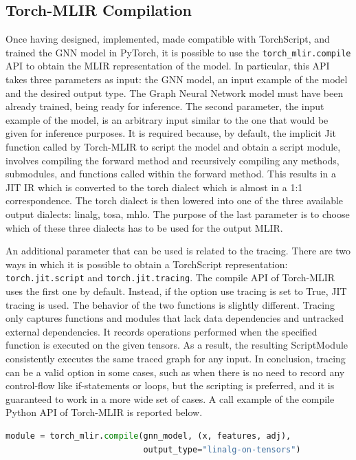 \subsection{Torch-MLIR Compilation}
\label{subsec:torch-mlir-compilation}%

Once having designed, implemented, made compatible with TorchScript, and trained the GNN model in PyTorch, it is possible to use the \lstinline{torch_mlir.compile} API to obtain the MLIR representation of the model.
In particular, this API takes three parameters as input: the GNN model, an input example of the model and the desired output type.
The Graph Neural Network model must have been already trained, being ready for inference.
The second parameter, the input example of the model, is an arbitrary input similar to the one that would be given for inference purposes.
It is required because, by default, the implicit Jit function called by Torch-MLIR to script the model and obtain a script module, involves compiling the forward method and recursively compiling any methods, submodules, and functions called within the forward method. This results in a JIT IR which is converted to the torch dialect which is almost in a 1:1 correspondence.
The torch dialect is then lowered into one of the three available output dialects: linalg, tosa, mhlo.
The purpose of the last parameter is to choose which of these three dialects has to be used for the output MLIR.

An additional parameter that can be used is related to the tracing.
There are two ways in which it is possible to obtain a TorchScript representation: \lstinline{torch.jit.script} and \lstinline{torch.jit.tracing}.
The compile API of Torch-MLIR uses the first one by default.
Instead, if the option use tracing is set to True, JIT tracing is used.
The behavior of the two functions is slightly different.
Tracing only captures functions and modules that lack data dependencies and untracked external dependencies.
It records operations performed when the specified function is executed on the given tensors.
As a result, the resulting ScriptModule consistently executes the same traced graph for any input.
In conclusion, tracing can be a valid option in some cases, such as when there is no need to record any control-flow like if-statements or loops, but the scripting is preferred, and it is guaranteed to work in a more wide set of cases.
A call example of the compile Python API of Torch-MLIR is reported below.
\begin{lstlisting}[language=Python,label={lst:torch_mlir-compile}]
module = torch_mlir.compile(gnn_model, (x, features, adj),
                            output_type="linalg-on-tensors")
\end{lstlisting}

